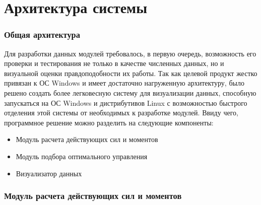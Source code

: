 \chapter{Архитектура системы}
\subsection{Общая архитектура}
\noindent\indent Для разработки данных модулей требовалось, в первую очередь,
возможность его проверки и тестирования не только в качестве численных данных, но
и визуальной оценки правдоподобности их работы. Так как целевой продукт жестко привязан
к ОС Windows и имеет достаточно нагруженную архитектуру, было решено создать более
легковесную систему для визуализации данных, способную запускаться на ОС Windows и
дистрибутивов Linux с возможностью быстрого отделения этой системы от необходимых
к разработке модулей.
Ввиду чего, программное решение можно разделить на следующие компоненты:
\begin{itemize}
  \item Модуль расчета действующих сил и моментов
  \item Модуль подбора оптимального управления
  \item Визуализатор данных
\end{itemize}
\subsection{Модуль расчета действующих сил и моментов}
\noindent\indent
